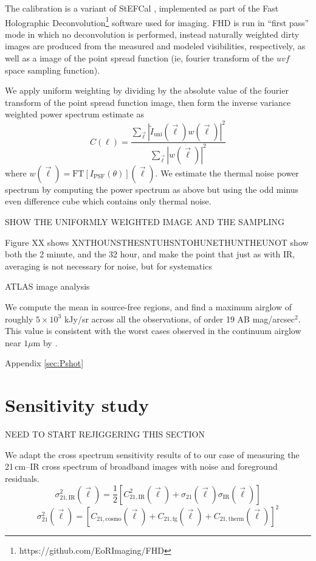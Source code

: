\documentclass[preprint]{aastex}
\newcommand{\IR}{\text{IR}}
\newcommand{\therm}{\text{therm}}
\newcommand{\cosmo}{\text{cosmo}}
\newcommand{\fg}{\text{fg}}
\begin{document}
The calibration is a variant of StEFCal \citep{stefcal}, implemented as part of the Fast Holographic Deconvolution\footnote{https://github.com/EoRImaging/FHD} \citep{fhd} software used for imaging. FHD is run in ``first pass'' mode in which no deconvolution is performed, instead naturally weighted dirty images are produced from the measured and modeled visibilities, respectively, as well as a image of the point spread function (ie, fourier transform of the $uvf$ space sampling function). 

We apply uniform weighting by dividing by the absolute value of the fourier transform of the point spread function image, then form the inverse variance weighted power spectrum estimate as
\begin{equation}
	C(\ell)=\frac{\sum_{\vec{\ell}}|\tilde{I}_\text{uni}(\vec{\ell})w(\vec{\ell})|^2}{\sum_{\vec{\ell}}|w(\vec{\ell})|^2}
\end{equation}
where $w(\vec{\ell})=\text{FT}[I_\text{PSF}(\theta)](\vec{\ell})$. We estimate the thermal noise power spectrum by computing the power spectrum as above but using the odd minus even difference cube which contains only thermal noise.

SHOW THE UNIFORMLY WEIGHTED IMAGE AND THE SAMPLING

Figure XX shows XNTHOUNSTHESNTUHSNTOHUNETHUNTHEUNOT
	show both the 2 minute, and the 32 hour, and make the point that just as with IR, averaging is not necessary for noise, but for systematics



ATLAS image analysis



We compute the mean in source-free regions, and find a maximum airglow of roughly $5\times10^3$ kJy/sr across all the observations, of order 19 AB mag/arcsec$^2$. This value is consistent with the worst cases observed in the continuum airglow near $1\mu$m by \citet{sullivan12}.

Appendix \ref{sec:Pshot}

\section{Sensitivity study}




NEED TO START REJIGGERING THIS SECTION

We adapt the cross spectrum sensitivity results of \citet{lidz09} to our case of measuring the 21\,cm--IR cross spectrum of broadband images with noise and foreground residuals. 
\begin{equation}
\label{eqn:sense1}
	\sigma_{21,\IR}^2(\vec{\ell})=\frac{1}{2}[C^2_{21,\IR}(\vec{\ell})+\sigma_{21}(\vec{\ell})\sigma_{\IR}(\vec{\ell})]
\end{equation}
\begin{equation}
\label{eqn:sense2}
	\sigma_{21}^2(\vec{\ell})=[C_{21,\cosmo}(\vec{\ell})+C_{21,\fg}(\vec{\ell})+C_{21,\therm}(\vec{\ell})]^2
\end{equation}
\end{document}
